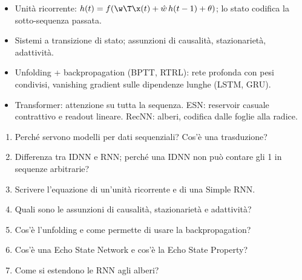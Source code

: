 \begin{puntichiave}
\begin{itemize}
  \item Unità ricorrente: $h(t) = f(\w\T\x(t)+\hat w\,h(t-1)+\theta)$; lo stato codifica la sotto-sequenza passata.
  \item Sistemi a transizione di stato; assunzioni di causalità, stazionarietà, adattività.
  \item Unfolding + backpropagation (BPTT, RTRL): rete profonda con pesi condivisi, vanishing gradient sulle dipendenze
        lunghe (LSTM, GRU).
  \item Transformer: attenzione su tutta la sequenza. ESN: reservoir casuale contrattivo e readout lineare. RecNN: alberi,
        codifica dalle foglie alla radice.
\end{itemize}
\end{puntichiave}

\begin{domande}
\begin{enumerate}
  \item Perché servono modelli per dati sequenziali? Cos'è una trasduzione?
  \item Differenza tra IDNN e RNN; perché una IDNN non può contare gli 1 in sequenze arbitrarie?
  \item Scrivere l'equazione di un'unità ricorrente e di una Simple RNN.
  \item Quali sono le assunzioni di causalità, stazionarietà e adattività?
  \item Cos'è l'unfolding e come permette di usare la backpropagation?
  \item Cos'è una Echo State Network e cos'è la Echo State Property?
  \item Come si estendono le RNN agli alberi?
\end{enumerate}
\end{domande}
